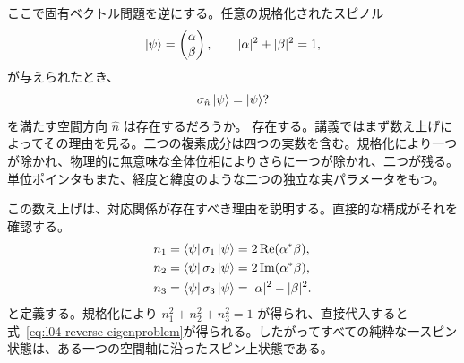 ここで固有ベクトル問題を逆にする。任意の規格化されたスピノル
\begin{equation}
  \left\lvert\psi\right\rangle=
  \begin{pmatrix}\alpha\\\beta\end{pmatrix},
  \qquad
  |\alpha|^2+|\beta|^2=1,
  \label{eq:l04-general-spinor}
\end{equation}
が与えられたとき、
\begin{equation}
  \sigma_{\hat n}\left\lvert\psi\right\rangle=\left\lvert\psi\right\rangle?
  \label{eq:l04-reverse-eigenproblem}
\end{equation}
を満たす空間方向 \(\hat n\) は存在するだろうか。
存在する。講義ではまず数え上げによってその理由を見る。二つの複素成分は四つの実数を含む。規格化により一つが除かれ、物理的に無意味な全体位相によりさらに一つが除かれ、二つが残る。単位ポインタもまた、経度と緯度のような二つの独立な実パラメータをもつ。

\begin{classroomqa}
\end{classroomqa}

\begin{classroomqa}
\end{classroomqa}

この数え上げは、対応関係が存在すべき理由を説明する。直接的な構成がそれを確認する。
\begin{align}
  n_1&=\left\langle\psi\right\rvert\sigma_1\left\lvert\psi\right\rangle
      =2\operatorname{Re}(\alpha^*\beta),
  \notag\\
  n_2&=\left\langle\psi\right\rvert\sigma_2\left\lvert\psi\right\rangle
      =2\operatorname{Im}(\alpha^*\beta),
  \notag\\
  n_3&=\left\langle\psi\right\rvert\sigma_3\left\lvert\psi\right\rangle
      =|\alpha|^2-|\beta|^2.
  \label{eq:l04-bloch-components}
\end{align}
と定義する。規格化により \(n_1^2+n_2^2+n_3^2=1\) が得られ、直接代入すると式~\eqref{eq:l04-reverse-eigenproblem}が得られる。したがってすべての純粋な一スピン状態は、ある一つの空間軸に沿ったスピン上状態である。

